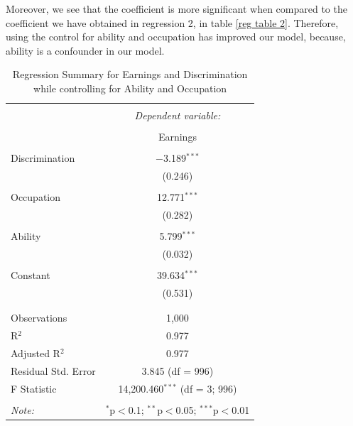\documentclass[a4paper,12pt,oneside,English]{article}
\begin{document}
Moreover, we see that the coefficient is more significant when compared to the coefficient we have obtained in regression 2, in table \ref{reg table 2}. Therefore, using the control for ability and occupation has improved our model, because, ability is a confounder in our model.

\begin{table}[!htbp] \centering 
  \caption{Regression Summary for Earnings and Discrimination while controlling for Ability and Occupation} 
  \label{reg table 4} 
\begin{tabular}{@{\extracolsep{5pt}}lc} 
\\[-1.8ex]\hline 
\hline \\[-1.8ex] 
 & \multicolumn{1}{c}{\textit{Dependent variable:}} \\ 
\cline{2-2} 
\\[-1.8ex] & Earnings \\ 
\hline \\[-1.8ex] 
 Discrimination & $-$3.189$^{***}$ \\ 
  & (0.246) \\ 
  & \\ 
 Occupation & 12.771$^{***}$ \\ 
  & (0.282) \\ 
  & \\ 
 Ability & 5.799$^{***}$ \\ 
  & (0.032) \\ 
  & \\ 
 Constant & 39.634$^{***}$ \\ 
  & (0.531) \\ 
  & \\ 
\hline \\[-1.8ex] 
Observations & 1,000 \\ 
R$^{2}$ & 0.977 \\ 
Adjusted R$^{2}$ & 0.977 \\ 
Residual Std. Error & 3.845 (df = 996) \\ 
F Statistic & 14,200.460$^{***}$ (df = 3; 996) \\ 
\hline 
\hline \\[-1.8ex] 
\textit{Note:}  & \multicolumn{1}{r}{$^{*}$p$<$0.1; $^{**}$p$<$0.05; $^{***}$p$<$0.01}
\end{tabular} 
\end{table}
\end{document}
